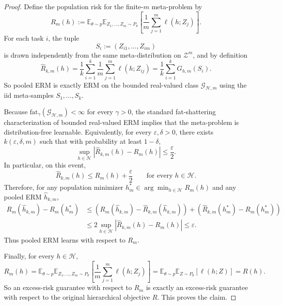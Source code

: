 \documentclass[11pt]{article}
\theoremstyle{definition}
\newcommand{\E}{\mathbb{E}}
\begin{document}
\begin{proof}
Define the population risk for the finite-$m$ meta-problem by
\[
R_m(h)
:=
\E_{\theta \sim p}\E_{Z_1,\dots,Z_m \sim P_{\theta}}
\left[\frac{1}{m}\sum_{j=1}^m \ell(h;Z_j)\right].
\]
For each task $i$, the tuple
\[
S_i := (Z_{i1},\dots,Z_{im})
\]
is drawn independently from the same meta-distribution on $\mathcal{Z}^m$, and by definition
\[
\widehat{R}_{k,m}(h)
=
\frac{1}{k}\sum_{i=1}^k \frac{1}{m}\sum_{j=1}^m \ell(h;Z_{ij})
=
\frac{1}{k}\sum_{i=1}^k G_{h,m}(S_i).
\]
So pooled ERM is exactly ERM on the bounded real-valued class $\mathcal{G}_{\mathcal{H},m}$ using the iid meta-samples $S_1,\dots,S_k$.

Because $\mathrm{fat}_{\gamma}(\mathcal{G}_{\mathcal{H},m}) < \infty$ for every $\gamma > 0$, the standard fat-shattering characterization of bounded real-valued ERM implies that the meta-problem is distribution-free learnable. Equivalently, for every $\varepsilon,\delta > 0$, there exists $k(\varepsilon,\delta,m)$ such that with probability at least $1-\delta$,
\[
\sup_{h \in \mathcal{H}}
\left|
\widehat{R}_{k,m}(h) - R_m(h)
\right|
\le \frac{\varepsilon}{2}.
\]
In particular, on this event,
\[
\widehat{R}_{k,m}(h) \le R_m(h) + \frac{\varepsilon}{2}
\qquad \text{for every } h \in \mathcal{H}.
\]
Therefore, for any population minimizer $h_m^* \in \arg\min_{h \in \mathcal{H}} R_m(h)$ and any pooled ERM $\widehat{h}_{k,m}$,
\begin{align*}
R_m(\widehat{h}_{k,m}) - R_m(h_m^*)
&\le
\left(
R_m(\widehat{h}_{k,m}) - \widehat{R}_{k,m}(\widehat{h}_{k,m})
\right)
+
\left(
\widehat{R}_{k,m}(h_m^*) - R_m(h_m^*)
\right) \\
&\le
2 \sup_{h \in \mathcal{H}}
\left|
\widehat{R}_{k,m}(h) - R_m(h)
\right|
\le \varepsilon.
\end{align*}
Thus pooled ERM learns with respect to $R_m$.

Finally, for every $h \in \mathcal{H}$,
\[
R_m(h)
=
\E_{\theta \sim p}\E_{Z_1,\dots,Z_m \sim P_{\theta}}
\left[\frac{1}{m}\sum_{j=1}^m \ell(h;Z_j)\right]
=
\E_{\theta \sim p}\E_{Z \sim P_{\theta}}[\ell(h;Z)]
=
R(h).
\]
So an excess-risk guarantee with respect to $R_m$ is exactly an excess-risk guarantee with respect to the original hierarchical objective $R$. This proves the claim.
\end{proof}
\end{document}
